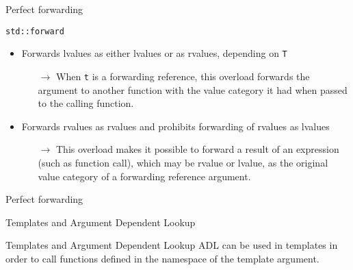 \begin{frame}{Perfect forwarding}{}
  \begin{block}{\texttt{std::forward}}
    \begin{itemize}
    \item
      Forwards lvalues as either lvalues or as rvalues, depending on \lstinline!T!
      \begin{itemize}
      \item[$\to$]
        When \lstinline!t! is a forwarding reference, this overload forwards the argument to another function with the value category it had when passed to the calling function.
      \end{itemize}
    \item
      Forwards rvalues as rvalues and prohibits forwarding of rvalues as lvalues
      \begin{itemize}
      \item[$\to$]
        This overload makes it possible to forward a result of an expression (such as function call), which may be rvalue or lvalue, as the original value category of a forwarding reference argument.
      \end{itemize}
    \end{itemize}
  \end{block}

  \small
\end{frame}

\begin{frame}{Perfect forwarding}{}
  \begin{example}
  \end{example}
\end{frame}

\begin{frame}{Templates and Argument Dependent Lookup}{}
  \begin{block}{Templates and Argument Dependent Lookup}
    ADL can be used in templates in order to call functions defined in the namespace of the template argument.
  \end{block}
  \begin{example}
  \end{example}
\end{frame}

